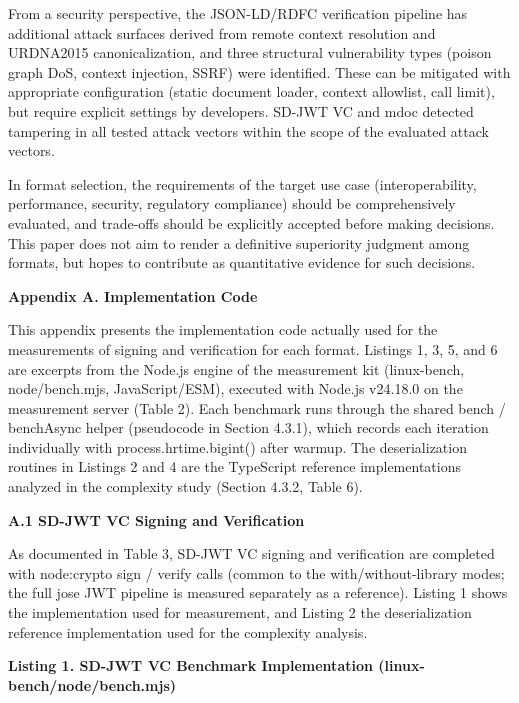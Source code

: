 From a security perspective, the JSON-LD/RDFC verification pipeline has additional attack surfaces derived from remote context resolution and URDNA2015 canonicalization, and three structural vulnerability types (poison graph DoS, context injection, SSRF) were identified. These can be mitigated with appropriate configuration (static document loader, context allowlist, call limit), but require explicit settings by developers. SD-JWT VC and mdoc detected tampering in all tested attack vectors within the scope of the evaluated attack vectors.

In format selection, the requirements of the target use case (interoperability, performance, security, regulatory compliance) should be comprehensively evaluated, and trade-offs should be explicitly accepted before making decisions. This paper does not aim to render a definitive superiority judgment among formats, but hopes to contribute as quantitative evidence for such decisions.

\textbf{Appendix A. Implementation Code}

This appendix presents the implementation code actually used for the measurements of signing and verification for each format. Listings 1, 3, 5, and 6 are excerpts from the Node.js engine of the measurement kit (linux-bench, node/bench.mjs, JavaScript/ESM), executed with Node.js v24.18.0 on the measurement server (Table 2). Each benchmark runs through the shared bench / benchAsync helper (pseudocode in Section 4.3.1), which records each iteration individually with process.hrtime.bigint() after warmup. The deserialization routines in Listings 2 and 4 are the TypeScript reference implementations analyzed in the complexity study (Section 4.3.2, Table 6).

\textbf{A.1 SD-JWT VC Signing and Verification}

As documented in Table 3, SD-JWT VC signing and verification are completed with node:crypto sign / verify calls (common to the with/without-library modes; the full jose JWT pipeline is measured separately as a reference). Listing 1 shows the implementation used for measurement, and Listing 2 the deserialization reference implementation used for the complexity analysis.

\textbf{Listing 1. SD-JWT VC Benchmark Implementation (linux-bench/node/bench.mjs)}

